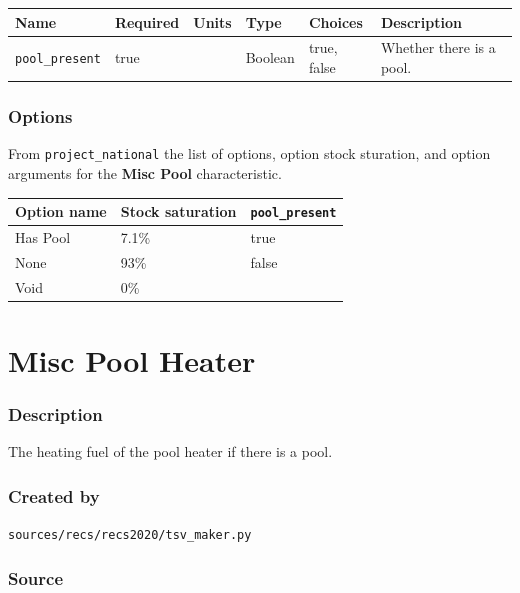 \begin{longtable}[]{@{}llllll@{}}
\toprule\noalign{}
Name & Required & Units & Type & Choices & Description \\
\midrule\noalign{}
\endhead
\bottomrule\noalign{}
\endlastfoot
\texttt{pool\_present} & true & & Boolean & true, false & Whether there
is a pool. \\
\end{longtable}

\subsubsection{Options}\label{options-120}

From \texttt{project\_national} the list of options, option stock
sturation, and option arguments for the \textbf{Misc Pool}
characteristic.

\begin{longtable}[]{@{}lll@{}}
\toprule\noalign{}
Option name & Stock saturation & \texttt{pool\_present} \\
\midrule\noalign{}
\endhead
\bottomrule\noalign{}
\endlastfoot
Has Pool & 7.1\% & true \\
None & 93\% & false \\
Void & 0\% & \\
\end{longtable}

\section{Misc Pool Heater}\label{misc_pool_heater}

\subsubsection{Description}\label{description-117}

The heating fuel of the pool heater if there is a pool.

\subsubsection{Created by}\label{created-by-118}

\texttt{sources/recs/recs2020/tsv\_maker.py}

\subsubsection{Source}\label{source-120}

